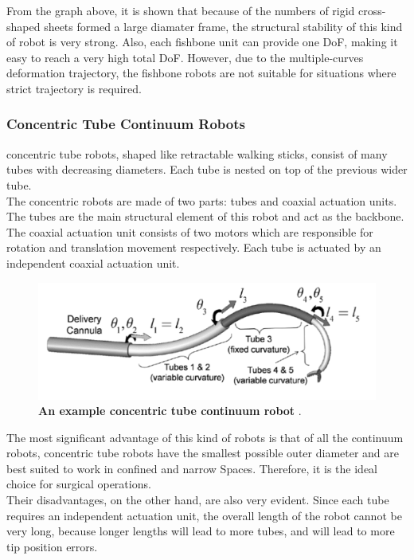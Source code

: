 \noindent From the graph above, it is shown that because of the numbers of rigid cross-shaped sheets formed a large diamater 
frame, the structural stability of this kind of robot is very strong. Also, each fishbone unit can provide one DoF, making it 
easy to reach a very high total DoF. However, due to the multiple-curves deformation trajectory, the fishbone robots are not 
suitable for situations where strict trajectory is required\cite{fishboneCR}.
\subsubsection{Concentric Tube Continuum Robots}
concentric tube robots, shaped like retractable walking sticks, consist of many tubes with decreasing diameters. Each tube is 
nested on top of the previous wider tube.  \\
The concentric robots are made of two parts: tubes and coaxial actuation units. The tubes are the main structural element of 
this robot and act as the backbone. The coaxial actuation unit consists of two motors which are responsible for rotation and 
translation movement respectively. Each tube is actuated by an independent coaxial actuation unit. 
\begin{figure}[H] %
    \centering %
    \captionsetup{labelsep=colon}
    \includegraphics[width=.9\textwidth]{Image/LR/concentric_tube_CR.PNG} 
    \caption[An example concentric tube continuum robot]
    {\centering \textbf{An example concentric tube continuum robot} \cite{CTCR_example}.}
    \label{fig:CTCR_example}
\end{figure}
\noindent The most significant advantage of this kind of robots is that of all the continuum robots, concentric tube robots have the 
smallest possible outer diameter and are best suited to work in confined and narrow Spaces. Therefore, it is the ideal choice 
for surgical operations. \\
Their disadvantages, on the other hand, are also very evident. Since each tube requires an independent actuation unit, the 
overall length of the robot cannot be very long, because longer lengths will lead to more tubes, and will lead to more tip 
position errors.



\newpage